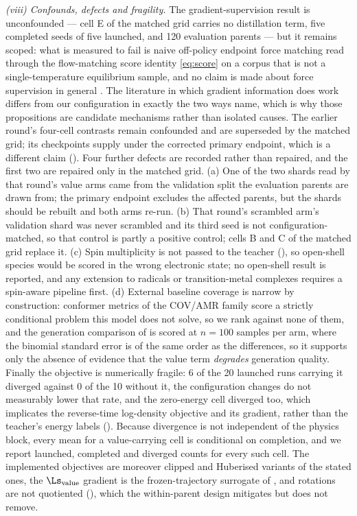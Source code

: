 \emph{(viii) Confounds, defects and fragility.} The gradient-supervision result is
unconfounded --- cell E of the matched grid carries no distillation term, five
completed seeds of five launched, and 120 evaluation parents --- but it remains scoped:
what is measured to fail is naive off-policy endpoint force matching read through the
flow-matching score identity \eqref{eq:score} on a corpus that is not a
single-temperature equilibrium sample, and no claim is made about force supervision in
general \citep{psm,driftingboltzmann}. The literature in which gradient information
does work differs from our configuration in exactly the two ways
 name, which is why those propositions are candidate
mechanisms rather than isolated causes. The earlier round's four-cell contrasts remain
confounded and are superseded by the matched grid; its checkpoints supply
 under the corrected primary endpoint, which is a different claim
(). Four further defects are recorded rather than repaired, and the
first two are repaired only in the matched grid. (a) One of the two shards read by
that round's value arms came from the validation split the evaluation parents are
drawn from; the primary endpoint excludes the affected parents, but the shards should
be rebuilt and both arms re-run. (b) That round's scrambled arm's validation shard was
never scrambled and its third seed is not configuration-matched, so that control is
partly a positive control; cells B and C of the matched grid replace it. (c) Spin
multiplicity is not passed to the teacher (), so open-shell species
would be scored in the wrong electronic state; no open-shell result is reported, and
any extension to radicals or transition-metal complexes requires a spin-aware pipeline
first. (d) External baseline coverage is narrow by construction: conformer metrics of
the COV/AMR family score a strictly conditional problem this model does not solve, so
we rank against none of them, and the generation comparison of  is
scored at $n = 100$ samples per arm, where the binomial standard error is of the same
order as the differences, so it supports only the absence of evidence that the value
term \emph{degrades} generation quality. Finally the objective is numerically fragile:
6 of the 20 launched runs carrying it diverged against 0 of the 10 without it, the
configuration changes do not measurably lower that rate, and the zero-energy cell
diverged too, which implicates the reverse-time log-density objective and its gradient,
rather than the teacher's energy labels (). Because divergence is not
independent of the physics block, every mean for a value-carrying cell is conditional
on completion, and we report launched, completed and diverged counts for every such
cell. The implemented objectives are moreover clipped and Huberised variants of the
stated ones, the $\Ls_{\mathrm{value}}$ gradient is the frozen-trajectory surrogate of
, and rotations are not quotiented (), which the
within-parent design mitigates but does not remove.

